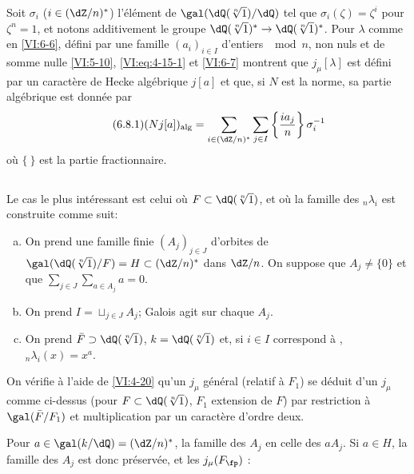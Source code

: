 Soit $\sigma_i$ ($i\in (\dZ/n)^\ast$) l'élément de 
$\gal(\dQ(\sqrt[n]{1})/\dQ)$ tel que $\sigma_i(\zeta)=\zeta^i$ pour $\zeta^n=1$, 
et notons additivement le groupe  
$\dQ(\sqrt[n]{1})^\ast \to \dQ(\sqrt[n]{1})^\ast$. Pour $\lambda$ comme en 
\ref{VI:6-6}, défini par une famille $(a_i)_{i\in I}$ d'entiers $\mod n$, non 
nuls et de somme nulle \ref{VI:5-10}, \eqref{VI:eq:4-15-1} et \ref{VI:6-7} 
montrent que $j_\mu[\lambda]$ est défini par un caractère de Hecke 
algébrique $j[a]$ et que, si $N$ est la norme, sa partie algébrique est 
donnée par 
\begin{equation*}\tag{6.8.1}\label{VI:eq:6-8-1}
  (N j[a])_\text{alg} = \sum_{i\in (\dZ/n)^\ast} \sum_{j\in I} \left\{ \frac{i a_j}{n} \right\} \sigma_i^{-1} 
\end{equation*}
où $\{\ \}$ est la partie fractionnaire. 





\subsection{}\label{VI:6-9}

Le cas le plus intéressant est celui où $F\subset \dQ(\sqrt[n]{1})$, et 
où la famille des $_n \lambda_i$ est construite comme suit: 
\begin{enumerate}[a)]
  \item On prend une famille finie $(A_j)_{j\in J}$ d'orbites de 
    $\gal(\dQ(\sqrt[n]{1})/F)=H\subset (\dZ/n)^\ast$ dans $\dZ/n$. On suppose que 
    $A_j\ne\{0\}$ et que $\sum_{j\in J} \sum_{a\in A_j} a=0$. 
  
\item {}On prend $I=\sqcup_{j\in J} A_j$; Galois agit sur chaque $A_j$. 
  \item On prend $\bar F\supset \dQ(\sqrt[n]{1})$, $k=\dQ(\sqrt[n]{1})$ et, si 
    $i\in I$ correspond à , 
    $_n\lambda_i(x)=x^a$. 
\end{enumerate}

On vérifie à l'aide de \ref{VI:4-20} qu'un $j_\mu$ général (relatif à 
$F_1$) se déduit d'un $j_\mu$ comme ci-dessus (pour 
$F\subset \dQ(\sqrt[n]{1})$, $F_1$ extension de $F$) par restriction à 
$\gal(\bar F/F_1)$ et multiplication par un caractère d'ordre deux. 

Pour $a\in \gal(k/\dQ)=(\dZ/n)^\ast$,  la famille des $A_j$ 
en celle des $a A_j$. Si $a\in H$, la famille des $A_j$ est donc préservée, 
et les $j_\mu(F_\fp)$ : 





